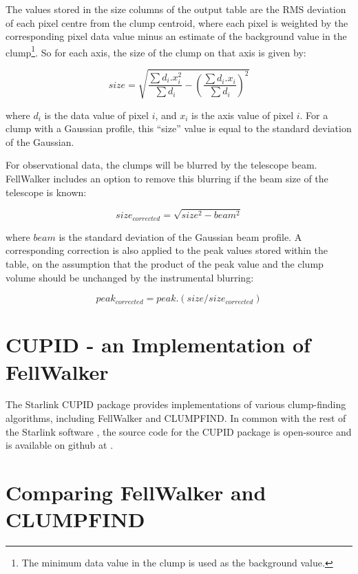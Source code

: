 \documentclass[final,authoryear,5p,times,twocolumn]{elsarticle}
\begin{document}
The values stored in the size columns of the output table are the RMS
deviation of each pixel centre from the clump centroid, where each pixel
is weighted by the corresponding pixel data value minus an estimate of
the background value in the clump\footnote{The minimum data value in the
clump is used as the background value.}. So for each axis, the size of
the clump on that axis is given by:

\[ size = \sqrt{ \frac{ \sum d_{i}.x_{i}^{2} }{ \sum d_{i} } -
\left( \frac{\sum d_{i}.x_{i} }{\sum d_{i}}  \right)^2 } \]

where $d_{i}$ is the data value of pixel $i$, and $x_{i}$ is the axis
value of pixel $i$. For a clump with a Gaussian profile, this
``size'' value is equal to the standard deviation of the Gaussian.

For observational data, the clumps will be blurred by the telescope beam.
FellWalker includes an option to remove this blurring if the beam size of
the telescope is known:

\[ size_{corrected} = \sqrt{ size^{2} - beam^{2} } \]

where $beam$ is the standard deviation of the Gaussian beam profile. A
corresponding correction is also applied to the peak values stored within
the table, on the assumption that the product of the peak value and the
clump volume should be unchanged by the instrumental blurring:

\[ peak_{corrected} = peak.(size/size_{corrected}) \]




\section{\label{sec:cupid}CUPID - an Implementation of FellWalker}
The Starlink CUPID package \citep[][]{CupidAdass,SUN255} provides
implementations of various clump-finding algorithms, including FellWalker
and CLUMPFIND. In common with the rest of the Starlink software \citep[][]{StarlinkAdass},
the source code for the CUPID package is open-source and is available on github at
.

\section{Comparing FellWalker and CLUMPFIND}
\end{document}
